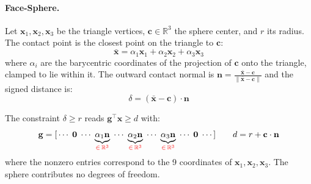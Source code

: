 \documentclass{article}
\newcommand{\red}[1]{\textcolor{red}{#1}}
\begin{document}
\paragraph{Face-Sphere.}
Let $\mathbf{x}_1, \mathbf{x}_2, \mathbf{x}_3$ be the triangle vertices, $\mathbf{c} \in \mathbb{R}^3$ the sphere center, and $r$ its radius. The contact point is the closest point on the triangle to $\mathbf{c}$:
\begin{equation*}
    \bar{\mathbf{x}} = \alpha_1\mathbf{x}_1 + \alpha_2\mathbf{x}_2 + \alpha_3\mathbf{x}_3
\end{equation*}
where $\alpha_i$ are the barycentric coordinates of the projection of $\mathbf{c}$ onto the triangle, clamped to lie within it. The outward contact normal is $\mathbf{n} = \frac{\bar{\mathbf{x}} - \mathbf{c}}{\|\bar{\mathbf{x}} - \mathbf{c}\|}$ and the signed distance is:
\begin{equation*}
    \delta = (\bar{\mathbf{x}} - \mathbf{c}) \cdot \mathbf{n}
\end{equation*}
\begin{derivation}
The constraint $\delta \geq r$ reads $\mathbf{g}^\top\mathbf{x} \geq d$ with:
\begin{equation*}
    \mathbf{g} = [\,\cdots\;\mathbf{0}\;\cdots\;
    \underbrace{\alpha_1\mathbf{n}}_{\red{\in\,\mathbb{R}^3}}\;\cdots\;
    \underbrace{\alpha_2\mathbf{n}}_{\red{\in\,\mathbb{R}^3}}\;\cdots\;
    \underbrace{\alpha_3\mathbf{n}}_{\red{\in\,\mathbb{R}^3}}\;\cdots\;\mathbf{0}\;\cdots\,]
    \qquad
    d = r + \mathbf{c}\cdot\mathbf{n}
\end{equation*}
where the nonzero entries correspond to the 9 coordinates of $\mathbf{x}_1, \mathbf{x}_2, \mathbf{x}_3$. The sphere contributes no degrees of freedom.
\end{derivation}
\end{document}
